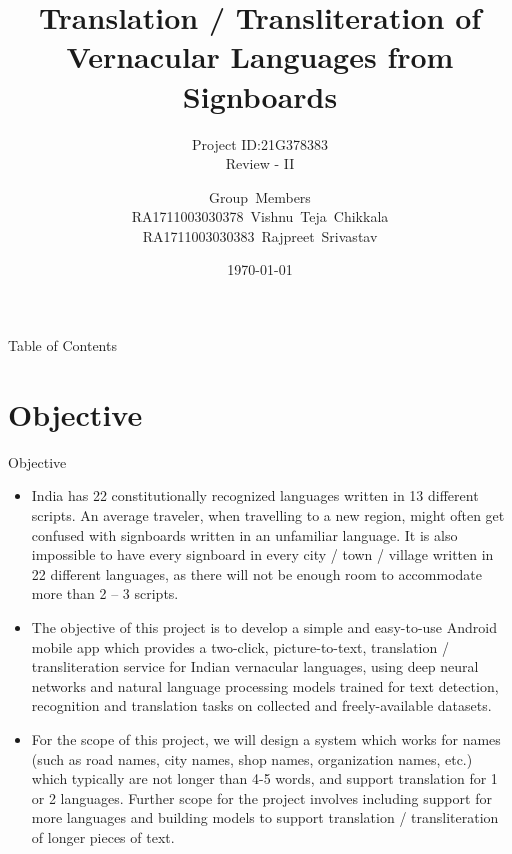 \documentclass{beamer}
\title[21G378383]{Translation / Transliteration of Vernacular Languages from Signboards}
\subtitle{Project ID:21G378383\\Review - II}
\author[SRM Institute of Science \& Technology]{Group~Members\\RA1711003030378~Vishnu~Teja~Chikkala\\RA1711003030383~Rajpreet~Srivastav\\ \medskip{Supervised By:\\Mr.~Sunil~Kumar\\Assistant~Professor}}
\institute[]{Department of Computer Science \& Engineering\\Faculty of Engineering \& Technology\\SRM Institute of Science \& Technology}
\date{\today}
\begin{document}
	\begin{frame}
		\maketitle
		\date{}
	\end{frame}
	\begin{frame}[allowframebreaks]{Table of Contents} %
		\tableofcontents[sections={1-4}]
		\framebreak
		\tableofcontents[sections={5-8}]
	\end{frame}
	
\section{Objective}
\begin{frame}[allowframebreaks]{Objective}
\begin{itemize}
	\item India has 22 constitutionally recognized languages written in 13 different scripts. An average traveler, when travelling to a new region, might often get confused with signboards written in an unfamiliar language. It is also impossible to have every signboard in every city / town / village written in 22 different languages, as there will not be enough room to accommodate more than 2 – 3 scripts.
	\item The objective of this project is to develop a simple and easy-to-use Android mobile app which provides a two-click, picture-to-text, translation / transliteration service for Indian vernacular languages, using deep neural networks and natural language processing models trained for text detection, recognition and translation tasks on collected and freely-available datasets.
	\item For the scope of this project, we will design a system which works for names (such as road names, city names, shop names, organization names, etc.) which typically are not longer than 4-5 words, and support translation for 1 or 2 languages. Further scope for the project involves including support for more languages and building models to support translation / transliteration of longer pieces of text.
\end{itemize}
\end{frame}
\end{document}
